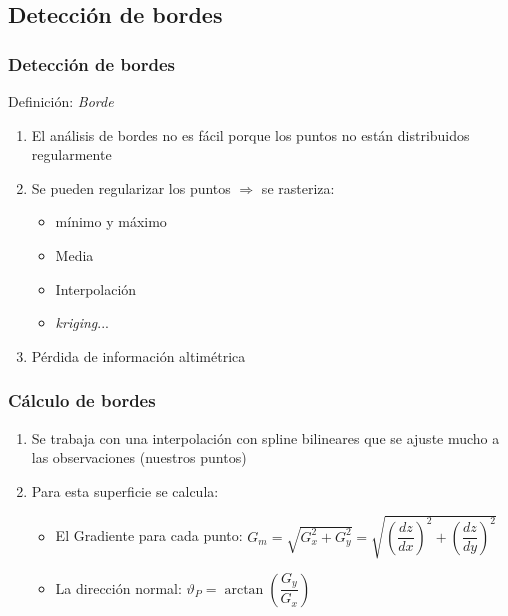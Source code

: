 \subsection{Detección de bordes}
\begin{frame}
  \frametitle{Detección de bordes}
\begin{beamerboxesrounded}[shadow=true]{Definición: \emph{Borde}}
    \end{beamerboxesrounded}
\begin{enumerate}
 \item<3-> El análisis de bordes no es fácil porque los puntos no están distribuidos regularmente
 \item<4-> Se pueden regularizar los puntos $\Rightarrow$ se rasteriza: 
    \begin{itemize}
        \item<4-> \alert<4>{mínimo} y \alert<4>{máximo}
	\item<5-> \alert<5>{Media}
	\item<6-> \alert<6>{Interpolación}
	\item<7-> \alert<7>{\emph{kriging}}...
    \end{itemize}
  \item<8-> \alert<8>{Pérdida de información} altimétrica
\end{enumerate}
\end{frame}
\begin{frame}
  \frametitle{Cálculo de bordes}
\begin{enumerate}
  \item Se trabaja con una interpolación con spline bilineares que se ajuste mucho a las observaciones (nuestros puntos)
  \item<2->{Para esta superficie se calcula:}
\begin{itemize}
 \item<2-> El \alert<2>{Gradiente} para cada punto: $G_m = \sqrt{G_x^2 + G_y^2} = \sqrt{\left( \dfrac{dz}{dx}\right)^2 + \left( \dfrac{dz}{dy}\right)^2}$
 \item<3-> La \alert<3>{dirección normal}: $\vartheta_P = \arctan\left(\dfrac{G_y}{G_x} \right)$
\end{itemize}
\end{enumerate}

\end{frame}
